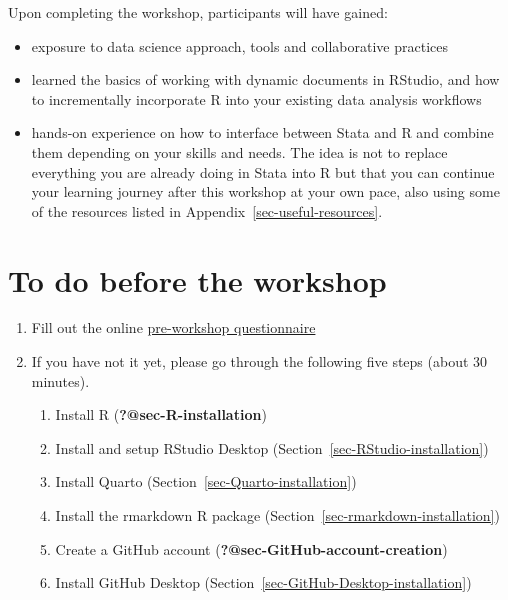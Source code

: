 \documentclass[
  letterpaper,
  DIV=11,
  numbers=noendperiod]{scrreprt}
\providecommand{\tightlist}{%
  \setlength{\itemsep}{0pt}\setlength{\parskip}{0pt}}\usepackage{longtable,booktabs,array}
\begin{document}
Upon completing the workshop, participants will have gained:

\begin{itemize}
\tightlist
\item
  exposure to data science approach, tools and collaborative practices
\item
  learned the basics of working with dynamic documents in RStudio, and
  how to incrementally incorporate R into your existing data analysis
  workflows
\item
  hands-on experience on how to interface between Stata and R and
  combine them depending on your skills and needs. The idea is not to
  replace everything you are already doing in Stata into R but that you
  can continue your learning journey after this workshop at your own
  pace, also using some of the resources listed in
  Appendix~\ref{sec-useful-resources}.
\end{itemize}

\hypertarget{to-do-before-the-workshop}{%
\section{To do before the workshop}\label{to-do-before-the-workshop}}

\begin{enumerate}
\def\labelenumi{\arabic{enumi}.}
\item
  Fill out the online
  \href{https://timicodktest.smartforest.de/-/single/cac06e76b3e163e655e49626f8129de8f55a8035ced54f15bc4c6cf527dba8a7?st=DnBRz677PIYh33ML0rE1amWzyhCIYPGFQnmZ6AAou8nJFyikWN6nLM5i3G4I0YZN}{pre-workshop
  questionnaire}
\item
  If you have not it yet, please go through the following five steps
  (about 30 minutes).

  \begin{enumerate}
  \def\labelenumii{\alph{enumii}.}
  \item
    Install R (\textbf{?@sec-R-installation})
  \item
    Install and setup RStudio Desktop
    (Section~\ref{sec-RStudio-installation})
  \item
    Install Quarto (Section~\ref{sec-Quarto-installation})
  \item
    Install the rmarkdown R package
    (Section~\ref{sec-rmarkdown-installation})
  \item
    Create a GitHub account (\textbf{?@sec-GitHub-account-creation})
  \item
    Install GitHub Desktop
    (Section~\ref{sec-GitHub-Desktop-installation})
  \end{enumerate}
\end{enumerate}
\end{document}
